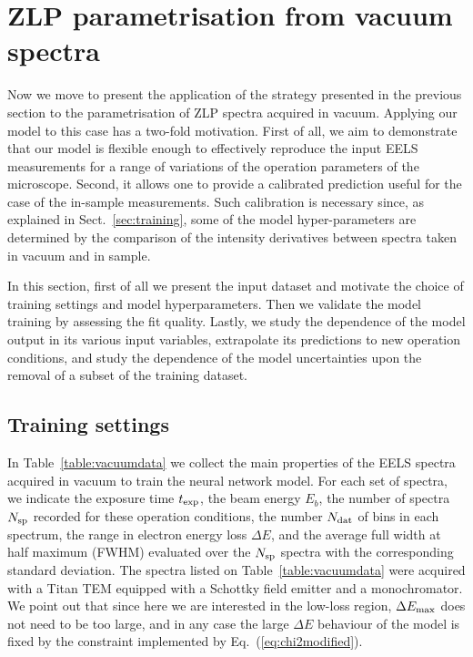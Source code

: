 \section{ZLP parametrisation from vacuum spectra}
\label{sec:results_vacuum}

Now we move to present the application of the strategy presented in the previous
section to the parametrisation of ZLP spectra acquired in vacuum.
%
Applying our model to this case has a two-fold motivation.
%
First of all, we aim to demonstrate that our model is flexible enough to effectively reproduce the
input EELS measurements for a range of variations of the operation parameters of the microscope.
%
Second, it allows one to provide a calibrated prediction
useful for the case of the in-sample measurements.
%
Such calibration is necessary since, as explained in Sect.~\ref{sec:training}, some of the model
hyper-parameters are determined by the comparison of the intensity derivatives
between spectra taken in vacuum and in sample.

In this section, first of all we present the input dataset and motivate the choice
of training settings and model hyperparameters.
%
Then we validate the model training by assessing the fit quality.
%
Lastly, we study the dependence of the model output in its various input
variables, extrapolate  its predictions to new operation
conditions, and study the dependence of the model uncertainties upon
the removal of a subset of the training dataset.

\subsection{Training settings}

In Table~\ref{table:vacuumdata} we collect the main properties of the EELS spectra acquired in vacuum to train the neural
    network model.  For each set of spectra, we indicate the exposure time $t_{\rm exp}$, the beam energy
    $E_b$, the number of spectra $N_{\rm sp}$ recorded for these operation conditions, the number $N_{\rm dat}$ of
    bins in each spectrum, the range in electron energy loss $\Delta E$,
    and the average full width at half maximum (FWHM)
    evaluated over the $N_{\rm sp}$ spectra with the corresponding standard deviation.
    The spectra  listed on Table~\ref{table:vacuumdata}
    were acquired with a Titan TEM equipped with a Schottky field emitter
    and a monochromator.
    We point out that since here
    we are interested in the low-loss region, $\Delta E_{\rm max}$ does not need
    to be too large, and in any case the large $\Delta E$ behaviour of the model is fixed
    by the constraint implemented by Eq.~(\ref{eq:chi2modified}).

